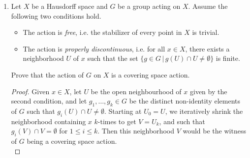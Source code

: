 \documentclass{article}
\begin{document}
\begin{enumerate}
\begin{proof}
      Finally, we show that $X$ is Hausdorff. Let $x_1$, $x_2$ be two
      distinct points in $X$. Let $\mathcal{O}_1$, $\mathcal{O}_2$ be open
      sets containing $x_1$ and $x_2$ respectively given by the definition
      of the covering space property of $\pi$. For $i=1,2$, let
      $\mathcal{U}_i\subseteq\pi^{-1}(\mathcal{O}_i)$ be one of the open
      sets of $\tilde{X}$ that is homeomorphic to $\mathcal{O}_i$ under the
      restriction map of $\pi$. Let $\tilde{x_i}\in\mathcal{U}_i$ be the
      pre-image of $x_i$. Then $\tilde{x_1}$ and $\tilde{x_2}$ are
      distinct, so by Hausdorff property of $\tilde{X}$, they must be
      contained in disjoint open sets $\mathcal{U}_1'$ and $\mathcal{U}_2'$
      respectively. For $i=1,2$, let
      $\mathcal{O}_i'=\pi(\mathcal{U}_i\cap\mathcal{U}_i')$. Then since the
      restriction of $\pi$ to $\mathcal{U}_i$ is a homeomorphism,
      $\mathcal{O}_i'$ is an open set containing $x_i$. Also, from
      disjointness of $\mathcal{U}_0'$ and $\mathcal{U}_1'$,
      $\mathcal{O}_0'$ and $\mathcal{O}_1'$ must also be disjoint, which
      completes our proof that $X$ is Hausdorff.
    \end{proof}

  \item Let $X$ be a Hausdorff space and $G$ be a group acting on $X$.
    Assume the following two conditions hold.
    \begin{itemize}
      \item The action is \textit{free}, i.e. the stabilizer of every point
        in $X$ is trivial.
      \item The action is \textit{properly discontinuous}, i.e. for all
        $x\in X$, there exists a neighborhood $U$ of $x$ such that the set
        $\{g\in G\,|\, g(U)\cap U\neq\emptyset\}$ is finite.
    \end{itemize}
    Prove that the action of $G$ on $X$ is a covering space action.

    \begin{proof}
      Given $x\in X$, let $U$ be the open neighbourhood of $x$ given by the
      second condition, and let $g_1,\ldots,g_k\in G$ be the distinct
      non-identity elements of $G$ such that $g_i(U)\cap U\neq\emptyset$.
      Starting at $U_0=U$, we iteratively shrink the neighborhood
      containing $x$ $k$-times to get $V=U_k$, and such that $g_i(V)\cap
      V=\emptyset$ for $1\leq i\leq k$. Then this neighborhood $V$ would be
      the witness of $G$ being a covering space action. \\


\end{proof}
\end{enumerate}
\end{document}
